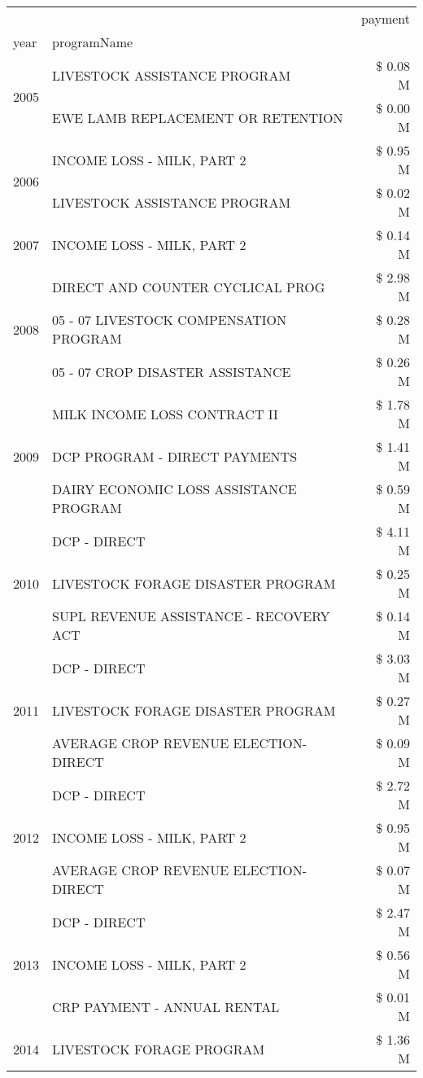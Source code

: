 \begin{tabular}{llr}
\toprule
 &  & payment \\
year & programName &  \\
\midrule
\multirow[t]{2}{*}{2005} & LIVESTOCK ASSISTANCE PROGRAM & \$ 0.08 M \\
 & EWE LAMB REPLACEMENT OR RETENTION & \$ 0.00 M \\
\cline{1-3}
\multirow[t]{2}{*}{2006} & INCOME LOSS - MILK, PART 2 & \$ 0.95 M \\
 & LIVESTOCK ASSISTANCE PROGRAM & \$ 0.02 M \\
\cline{1-3}
2007 & INCOME LOSS - MILK, PART 2 & \$ 0.14 M \\
\cline{1-3}
\multirow[t]{3}{*}{2008} & DIRECT AND COUNTER CYCLICAL PROG & \$ 2.98 M \\
 & 05 - 07 LIVESTOCK COMPENSATION PROGRAM & \$ 0.28 M \\
 & 05 - 07 CROP DISASTER ASSISTANCE & \$ 0.26 M \\
\cline{1-3}
\multirow[t]{3}{*}{2009} & MILK INCOME LOSS CONTRACT II & \$ 1.78 M \\
 & DCP PROGRAM - DIRECT PAYMENTS & \$ 1.41 M \\
 & DAIRY ECONOMIC LOSS ASSISTANCE PROGRAM & \$ 0.59 M \\
\cline{1-3}
\multirow[t]{3}{*}{2010} & DCP - DIRECT & \$ 4.11 M \\
 & LIVESTOCK FORAGE DISASTER PROGRAM & \$ 0.25 M \\
 & SUPL REVENUE ASSISTANCE - RECOVERY ACT & \$ 0.14 M \\
\cline{1-3}
\multirow[t]{3}{*}{2011} & DCP - DIRECT & \$ 3.03 M \\
 & LIVESTOCK FORAGE DISASTER PROGRAM & \$ 0.27 M \\
 & AVERAGE CROP REVENUE ELECTION-DIRECT & \$ 0.09 M \\
\cline{1-3}
\multirow[t]{3}{*}{2012} & DCP - DIRECT & \$ 2.72 M \\
 & INCOME LOSS - MILK, PART 2 & \$ 0.95 M \\
 & AVERAGE CROP REVENUE ELECTION-DIRECT & \$ 0.07 M \\
\cline{1-3}
\multirow[t]{3}{*}{2013} & DCP - DIRECT & \$ 2.47 M \\
 & INCOME LOSS - MILK, PART 2 & \$ 0.56 M \\
 & CRP PAYMENT - ANNUAL RENTAL & \$ 0.01 M \\
\cline{1-3}
\multirow[t]{3}{*}{2014} & LIVESTOCK FORAGE PROGRAM & \$ 1.36 M \\

\end{tabular}
